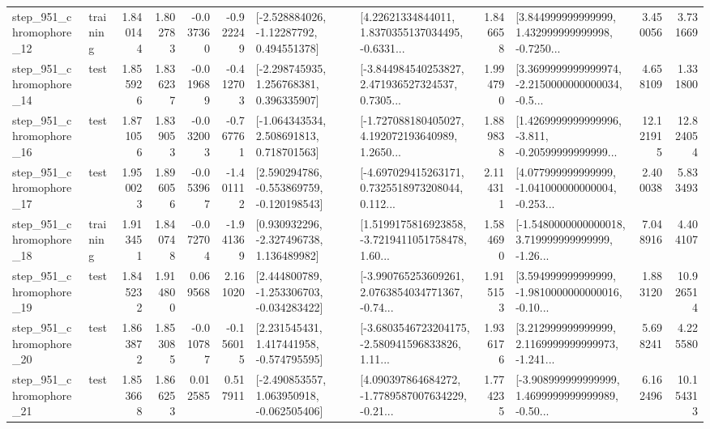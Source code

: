 \begin{tabular}{llrrrrllrlrr}
  step\_951\_chromophore\_12 &  training &      1.840144 &    1.802783 &     -0.037360 & -0.922249 &    [-2.528884026, -1.12287792, 0.494551378] &  [4.22621334844011, 1.8370355137034495, -0.6331... &       1.846658 &  [3.844999999999999, 1.432999999999998, -0.7250... &            3.450056 &          3.731669 \\
  step\_951\_chromophore\_14 &      test &      1.855926 &    1.836237 &     -0.019689 & -0.412703 &    [-2.298745935, 1.256768381, 0.396335907] &  [-3.844984540253827, 2.471936527324537, 0.7305... &       1.994790 &  [3.3699999999999974, -2.2150000000000034, -0.5... &            4.658109 &          1.331800 \\
  step\_951\_chromophore\_16 &      test &      1.871056 &    1.839053 &     -0.032003 & -0.767761 &    [-1.064343534, 2.508691813, 0.718701563] &  [-1.727088180405027, 4.192072193640989, 1.2650... &       1.889838 &  [1.4269999999999996, -3.811, -0.20599999999999... &           12.121915 &         12.824054 \\
  step\_951\_chromophore\_17 &      test &      1.950023 &    1.896056 &     -0.053967 & -1.401112 &   [2.590294786, -0.553869759, -0.120198543] &  [-4.697029415263171, 0.7325518973208044, 0.112... &       2.114311 &  [4.077999999999999, -1.041000000000004, -0.253... &            2.400038 &          5.833493 \\
  step\_951\_chromophore\_18 &  training &      1.913451 &    1.840748 &     -0.072704 & -1.941369 &    [0.930932296, -2.327496738, 1.136489982] &  [1.5199175816923858, -3.7219411051758478, 1.60... &       1.584690 &  [-1.5480000000000018, 3.719999999999999, -1.26... &            7.048916 &          4.404107 \\
  step\_951\_chromophore\_19 &      test &      1.845232 &    1.914800 &      0.069568 &  2.161020 &   [2.444800789, -1.253306703, -0.034283422] &  [-3.990765253609261, 2.0763854034771367, -0.74... &       1.915153 &  [3.594999999999999, -1.9810000000000016, -0.10... &            1.883120 &         10.926514 \\
  step\_951\_chromophore\_20 &      test &      1.863872 &    1.853085 &     -0.010787 & -0.156015 &    [2.231545431, 1.417441958, -0.574795595] &  [-3.6803546723204175, -2.580941596833826, 1.11... &       1.936176 &  [3.212999999999999, 2.1169999999999973, -1.241... &            5.698241 &          4.225580 \\
  step\_951\_chromophore\_21 &      test &      1.853668 &    1.866253 &      0.012585 &  0.517911 &   [-2.490853557, 1.063950918, -0.062505406] &  [4.090397864684272, -1.7789587007634229, -0.21... &       1.774235 &  [-3.908999999999999, 1.4699999999999989, -0.50... &            6.162496 &         10.154313 \\

\end{tabular}
